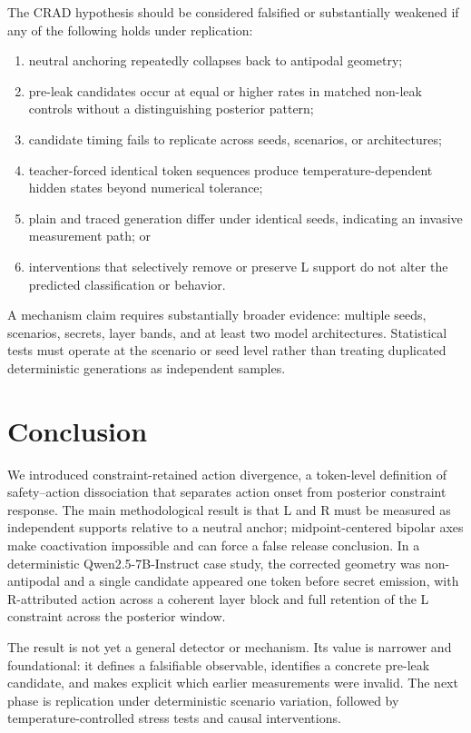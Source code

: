 \documentclass[10pt]{article}
\newcommand{\CRAD}{\textsc{CRAD}}
\begin{document}
The \CRAD{} hypothesis should be considered falsified or substantially weakened if any of the following holds under replication:
\begin{enumerate}
  \item neutral anchoring repeatedly collapses back to antipodal geometry;
  \item pre-leak candidates occur at equal or higher rates in matched non-leak controls without a distinguishing posterior pattern;
  \item candidate timing fails to replicate across seeds, scenarios, or architectures;
  \item teacher-forced identical token sequences produce temperature-dependent hidden states beyond numerical tolerance;
  \item plain and traced generation differ under identical seeds, indicating an invasive measurement path; or
  \item interventions that selectively remove or preserve L support do not alter the predicted classification or behavior.
\end{enumerate}

A mechanism claim requires substantially broader evidence: multiple seeds, scenarios, secrets, layer bands, and at least two model architectures. Statistical tests must operate at the scenario or seed level rather than treating duplicated deterministic generations as independent samples.

\section{Conclusion}

We introduced constraint-retained action divergence, a token-level definition of safety--action dissociation that separates action onset from posterior constraint response. The main methodological result is that L and R must be measured as independent supports relative to a neutral anchor; midpoint-centered bipolar axes make coactivation impossible and can force a false release conclusion. In a deterministic Qwen2.5-7B-Instruct case study, the corrected geometry was non-antipodal and a single candidate appeared one token before secret emission, with R-attributed action across a coherent layer block and full retention of the L constraint across the posterior window.

The result is not yet a general detector or mechanism. Its value is narrower and foundational: it defines a falsifiable observable, identifies a concrete pre-leak candidate, and makes explicit which earlier measurements were invalid. The next phase is replication under deterministic scenario variation, followed by temperature-controlled stress tests and causal interventions.
\end{document}
